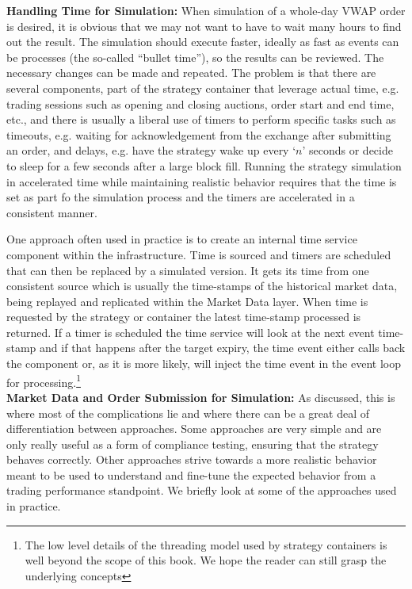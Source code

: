 \noindent\textbf{Handling Time for Simulation:} When simulation of a whole-day VWAP order is desired, it is obvious that we may not want to have to wait many hours to find out the result. The simulation should execute faster, ideally as fast as events can be processes (the so-called ``bullet time''), so the results can be reviewed. The necessary changes can be made and repeated. The problem is that there are several components, part of the strategy container that leverage actual time, e.g. trading sessions such as opening and closing auctions, order start and end time, etc., and there is usually a liberal use of timers to perform specific tasks such as timeouts, e.g. waiting for acknowledgement from the exchange after submitting an order, and delays, e.g. have the strategy wake up every `$n$' seconds or decide to sleep for a few seconds after a large block fill. Running the strategy simulation in accelerated time while maintaining realistic behavior requires that the time is set as part fo the simulation process and the timers are accelerated in a consistent manner.


One approach often used in practice is to create an internal time service component within the infrastructure. Time is sourced and timers are scheduled that can then be replaced by a simulated version. It gets its time from one consistent source which is usually the time-stamps of the historical market data, being replayed and replicated within the Market Data layer. When time is requested by the strategy or container the latest time-stamp processed is returned. If a timer is scheduled the time service will look at the next event time-stamp and if that happens after the target expiry, the time event either calls back the component or, as it is more likely, will inject the time event in the event loop for processing.\footnote{The low level details of the threading model used by strategy containers is well beyond the scope of this book. We hope the reader can still grasp the underlying concepts} \\


\noindent\textbf{Market Data and Order Submission for Simulation:} As discussed, this is where most of the complications lie and where there can be a great deal of differentiation between approaches. Some approaches are very simple and are only really useful as a form of compliance testing, ensuring that the strategy behaves correctly. Other approaches strive towards a more realistic behavior meant to be used to understand and fine-tune the expected behavior from a trading performance standpoint. We briefly look at some of the approaches used in practice. \\


